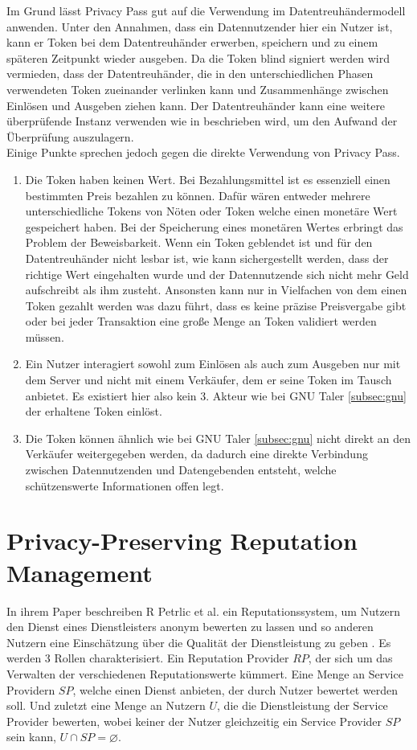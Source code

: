 \documentclass{scrreprt}
\begin{document}
Im Grund lässt Privacy Pass gut auf die Verwendung im Datentreuhändermodell anwenden. Unter den Annahmen, dass ein Datennutzender hier ein Nutzer ist, kann er Token bei dem Datentreuhänder erwerben, speichern und zu einem späteren Zeitpunkt wieder ausgeben. Da die Token blind signiert werden wird vermieden, dass der Datentreuhänder, die in den unterschiedlichen Phasen verwendeten Token zueinander verlinken kann und Zusammenhänge zwischen Einlösen und Ausgeben ziehen kann. Der Datentreuhänder kann eine weitere überprüfende Instanz verwenden wie in \cite{pp-davidson2018privacy} beschrieben wird, um den Aufwand der Überprüfung auszulagern. \\
Einige Punkte sprechen jedoch gegen die direkte Verwendung von Privacy Pass. 
\begin{enumerate}
    \item Die Token haben keinen Wert. Bei Bezahlungsmittel ist es essenziell einen bestimmten Preis bezahlen zu können. Dafür wären entweder mehrere unterschiedliche Tokens von Nöten oder Token welche einen monetäre Wert gespeichert haben. Bei der Speicherung eines monetären Wertes erbringt das Problem der Beweisbarkeit. Wenn ein Token geblendet ist und für den Datentreuhänder nicht lesbar ist, wie kann sichergestellt werden, dass der richtige Wert eingehalten wurde und der Datennutzende sich nicht mehr Geld aufschreibt als ihm zusteht. Ansonsten kann nur in Vielfachen von dem einen Token gezahlt werden was dazu führt, dass es keine präzise Preisvergabe gibt oder bei jeder Transaktion eine große Menge an Token validiert werden müssen.
    \item Ein Nutzer interagiert sowohl zum Einlösen als auch zum Ausgeben nur mit dem Server und nicht mit einem Verkäufer, dem er seine Token im Tausch anbietet. Es existiert hier also kein 3. Akteur wie bei GNU Taler \ref{subsec:gnu} der erhaltene Token einlöst.
    \item Die Token können ähnlich wie bei GNU Taler \ref{subsec:gnu} nicht direkt an den Verkäufer weitergegeben werden, da dadurch eine direkte Verbindung zwischen Datennutzenden und Datengebenden entsteht, welche schützenswerte Informationen offen legt.
\end{enumerate}

\section{Privacy-Preserving Reputation Management}
\label{subsec:rep}
In ihrem Paper beschreiben R Petrlic et al. ein Reputationssystem, um Nutzern den Dienst eines Dienstleisters anonym bewerten zu lassen und so anderen Nutzern eine Einschätzung über die Qualität der Dienstleistung zu geben \cite{petrlic2014privacy}. Es werden 3 Rollen charakterisiert. Ein Reputation Provider $RP$, der sich um das Verwalten der verschiedenen Reputationswerte kümmert. Eine Menge an Service Providern $SP$, welche einen Dienst anbieten, der durch Nutzer bewertet werden soll. Und zuletzt eine Menge an Nutzern $U$, die die Dienstleistung der Service Provider bewerten, wobei keiner der Nutzer gleichzeitig ein Service Provider $SP$ sein kann, $U \cap SP = \varnothing$. 
\end{document}
